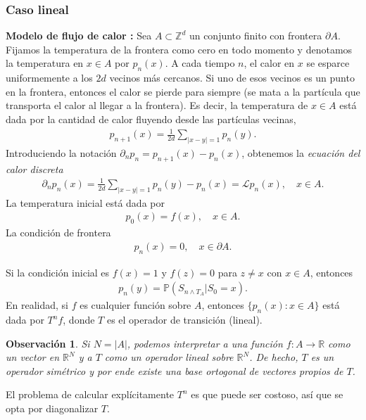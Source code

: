 \documentclass{article}
\newtheorem{obs}[theorem]{Observación}
\numberwithin{equation}{section}
\begin{document}
\subsubsection{Caso lineal}
\textbf{Modelo de flujo de calor : } Sea $A \subset \mathbb{Z}^d$ un conjunto finito con frontera $\partial A$. Fijamos la temperatura de la frontera como cero en todo momento y denotamos la temperatura en $x \in A$ por $p_n(x)$. A cada tiempo $n$, el calor en $x$ se esparce uniformemente a los $2d$ vecinos más cercanos. Si uno de esos vecinos es un punto en la frontera, entonces el calor se pierde para siempre (se mata a la partícula que transporta el calor al llegar a la frontera). Es decir, la temperatura de $x \in A$ está dada por la cantidad de calor fluyendo desde las partículas vecinas,
\begin{align*}
    p_{n+1}(x) = \frac{1}{2d}\sum_{|x-y| = 1}p_n(y).
\end{align*}
Introduciendo la notación $\partial_n p_n = p_{n+1}(x) - p_n(x)$, obtenemos la \emph{ecuación del calor discreta}
\begin{align}\label{ec-calor}
    \partial_np_n(x) = \frac{1}{2d}\sum_{|x-y| = 1}p_n(y) - p_n(x) = \mathcal{L}p_n(x), \quad x \in A.
\end{align}
La temperatura inicial está dada por
\begin{align}
    p_0(x) = f(x), \quad x \in A.
\end{align}
La condición de frontera
\begin{align}
    p_n(x) = 0, \quad x \in \partial A.
\end{align}

Si la condición inicial es $f(x) = 1$ y $f(z) = 0$ para $z \not = x$ con $x \in A$, entonces
\begin{align*}
    p_n(y) = \mathbb{P}(S_{n\land T_A} | S_0 = x).
\end{align*}
En realidad, si $f$ es cualquier función sobre $A$, entonces $\{p_n(x) : x \in A\}$ está dada por $T^nf$, donde $T$ es el operador de transición (lineal).

\begin{obs}
    Si $N = | A|$, podemos interpretar a una función $f : A \to \mathbb{R} $ como un vector en $\mathbb{R}^N$ y a $T$ como un operador lineal sobre $ \mathbb{R}^N$. De hecho, $T$ es un operador simétrico y por ende existe una base ortogonal de vectores propios de $T$.
\end{obs}

El problema de calcular explícitamente $T^n$ es que puede ser costoso, así que  se opta por diagonalizar $T$. 
\end{document}
